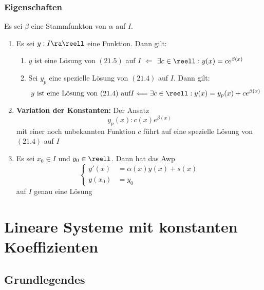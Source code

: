 \documentclass{kit}
\begin{document}
    \subsubsection{Eigenschaften}
      Es sei $\beta$ eine Stammfunkton von $\alpha$ auf $I$.
      \begin{enumerate}
        \item Es sei $y:I\ra\reell$ eine Funktion. Dann gilt:
          \begin{enumerate}[label=\roman*)]
            \item $y$ ist eine Lösung von $(21.5)$ auf $I$ $\Longleftarrow$ $\exists c\in\reell:y(x)=ce^{\beta(x)}$
            \item Sei $y_p$ eine spezielle Lösung von $(21.4)$ auf $I$. Dann gilt:
              $$y\text{ ist eine Lösung von $(21.4)$ auf} I\Longleftarrow\exists c\in\reell:y(x)=y_p(x)+ce^{\beta(x)}$$
          \end{enumerate}
        \item \textbf{Variation der Konstanten:} Der Ansatz
          $$y_p(x):c(x)e^{\beta(x)}$$
          mit einer noch unbekannten Funktion $c$ führt auf eine spezielle Lösung von $(21.4)$ auf $I$
        \item Es sei $x_0\in I$ und $y_0\in\reell$. Dann hat das Awp
          $$\begin{cases}
            y'(x) & =\alpha(x)y(x)+s(x)\\
            y(x_0) & =y_0
          \end{cases}$$
          auf $I$ genau eine Lösung
      \end{enumerate}
\section{Lineare Systeme mit konstanten Koeffizienten}
  \subsection{Grundlegendes}
\end{document}
